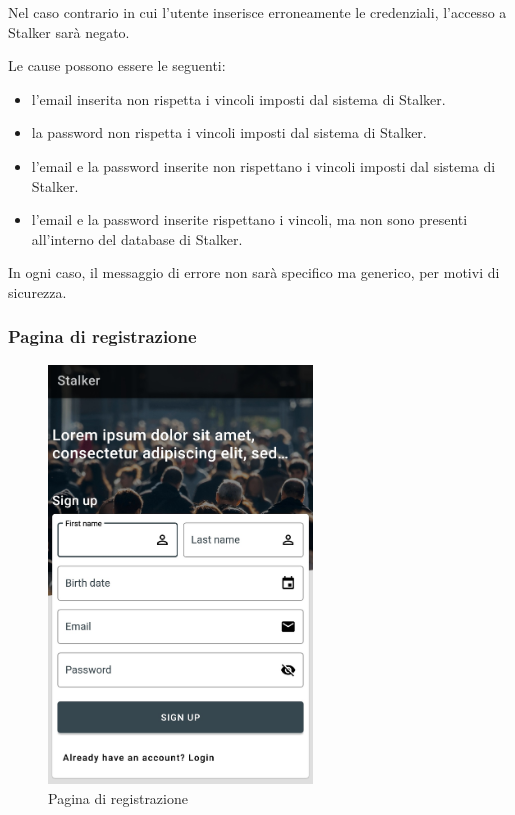 \documentclass[../manuale-utente.tex]{subfiles}
\begin{document}
Nel caso contrario in cui l'utente inserisce erroneamente le credenziali, l'accesso a Stalker sarà negato.

Le cause possono essere le seguenti:
\begin{itemize}
    \item l'email inserita non rispetta i vincoli imposti dal sistema di Stalker.
    \item la password non rispetta i vincoli imposti dal sistema di Stalker.
    \item l'email e la password inserite non rispettano i vincoli imposti dal sistema di Stalker.
    \item l'email e la password inserite rispettano i vincoli, ma non sono presenti all'interno del database di Stalker.
\end{itemize}

In ogni caso, il messaggio di errore non sarà specifico ma generico, per motivi di sicurezza.
\newpage

\subsubsection{Pagina di registrazione}%
\label{subs:pagina_di_registrazione}

\begin{figure}[H]
    \centering
    \includegraphics[width=70mm]{img/mobile-app/pagina-di-registrazione.jpg}
    \caption{Pagina di registrazione}%
    \label{fig:mobile_app_pagina_di_registrazione}
\end{figure}
\end{document}

